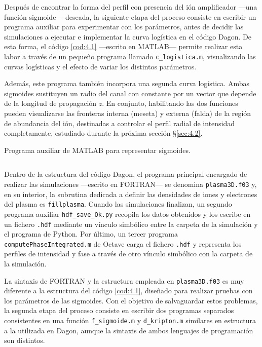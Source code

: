 Después de encontrar la forma del perfil con presencia del ión amplificador ---una función sigmoide--- deseada, la siguiente etapa del proceso consiste en escribir un programa auxiliar para experimentar con los parámetros, antes de decidir las simulaciones a ejecutar e implementar la curva logística en el código Dagon. De esta forma, el código \ref{cod:4.1} ---escrito en MATLAB--- permite realizar esta labor a través de un pequeño programa llamado \texttt{c\_logistica.m}, visualizando las curvas logísticas y el efecto de variar los distintos parámetros.

Además, este programa también incorpora una segunda curva logística. Ambas sigmoides sustituyen un radio del canal con  constante por un vector que depende de la longitud de propagación $z$. En conjunto, habilitando las dos funciones pueden visualizarse las fronteras interna (meseta) y externa (falda) de la región de abundancia del ión, destinadas a controlar el perfil radial de intensidad completamente, estudiado durante la próxima sección \S\ref{sec:4.2}.

\begin{listing}[htbp]
  \caption{Programa auxiliar de MATLAB para representar sigmoides.}
  \inputminted[firstline=1, lastline=38]{matlab}{Programas/c_logistica.m}
  \label{cod:4.1}
\end{listing}

Dentro de la estructura del código Dagon, el programa principal encargado de realizar las simulaciones ---escrito en FORTRAN--- se denomina \texttt{plasma3D.f03} y, en su interior, la subrutina dedicada a definir las densidades de iones y electrones del plasma es \texttt{fillplasma}. Cuando las simulaciones finalizan, un segundo programa auxiliar \texttt{hdf\_save\_Ok.py} recopila los datos obtenidos y los escribe en un fichero \texttt{.hdf} mediante un vínculo simbólico entre la carpeta de la simulación y el programa de Python. Por último, un tercer programa \texttt{computePhaseIntegrated.m} de Octave carga el fichero \texttt{.hdf} y representa los perfiles de intensidad y fase a través de otro vínculo simbólico con la carpeta de la simulación.

La sintaxis de FORTRAN y la estructura empleada en \texttt{plasma3D.f03} es muy diferente a la estructura del código \ref{cod:4.1}, diseñado para realizar pruebas con los parámetros de las sigmoides. Con el objetivo de salvaguardar estos problemas, la segunda etapa del proceso consiste en escribir dos programas separados consistentes en una función \texttt{f\_sigmoide.m} y \texttt{d\_kripton.m} similares en estructura a la utilizada en Dagon, aunque la sintaxis de ambos lenguajes de programación son distintos. 

